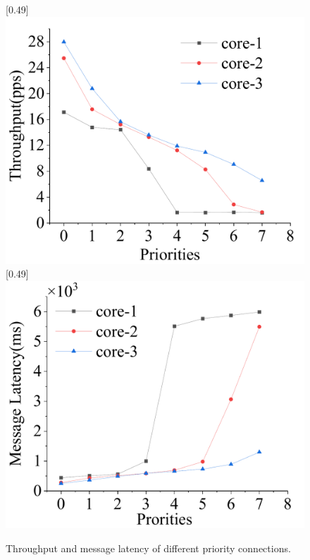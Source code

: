 \documentclass[sigconf,review,anonymous]{acmart}
\begin{document}
\begin{figure}[ht]
    \centering
    [0.49\linewidth]
    {
    \includegraphics[width=\linewidth]{assets/prio-throughput.pdf}
    }
    [0.49\linewidth]
    {
    \includegraphics[width=\linewidth]{assets/prio-latency.pdf}
    }
    \caption{Throughput and message latency of different priority connections.}
    \label{fig:prio-throughput-latency}
\end{figure}
\end{document}

